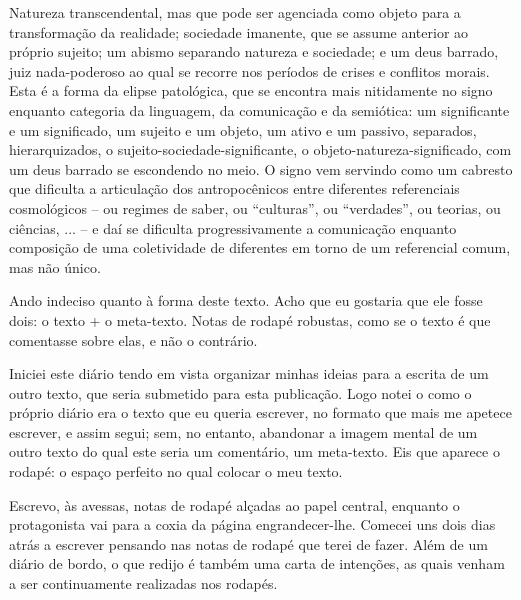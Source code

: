 Natureza transcendental, mas que pode ser agenciada como objeto para a transformação da realidade; sociedade imanente, que se assume anterior ao próprio sujeito; um abismo separando natureza e sociedade; e um deus barrado, juiz nada-poderoso ao qual se recorre nos períodos de crises e conflitos morais. Esta é a forma da elipse patológica, que se encontra mais nitidamente no signo enquanto categoria da linguagem, da comunicação e da semiótica: um significante e um significado, um sujeito e um objeto, um ativo e um passivo, separados, hierarquizados, o sujeito-sociedade-significante, o objeto-natureza-significado, com um deus barrado se escondendo no meio. O signo vem servindo como um cabresto que dificulta a articulação dos antropocênicos entre diferentes referenciais cosmológicos -- ou regimes de saber, ou \enquote{culturas}, ou \enquote{verdades}, ou teorias, ou ciências, ... -- e daí se dificulta progressivamente a comunicação enquanto composição de uma coletividade de diferentes em torno de um referencial comum, mas não único.


Ando indeciso quanto à forma deste texto. Acho que eu gostaria que ele fosse dois: o texto + o meta-texto. Notas de rodapé robustas, como se o texto é que comentasse sobre elas, e não o contrário.

Iniciei este diário tendo em vista organizar minhas ideias para a escrita de um outro texto, que seria submetido para esta publicação. Logo notei o como o próprio diário era o texto que eu queria escrever, no formato que mais me apetece escrever, e assim segui; sem, no entanto, abandonar a imagem mental de um outro texto do qual este seria um comentário, um meta-texto. Eis que aparece o rodapé: o espaço perfeito no qual colocar o meu texto.

Escrevo, às avessas, notas de rodapé alçadas ao papel central, enquanto o protagonista vai para a coxia da página engrandecer-lhe. Comecei uns dois dias atrás a escrever pensando nas notas de rodapé que terei de fazer. Além de um diário de bordo, o que redijo é também uma carta de intenções, as quais venham a ser continuamente realizadas nos rodapés.

